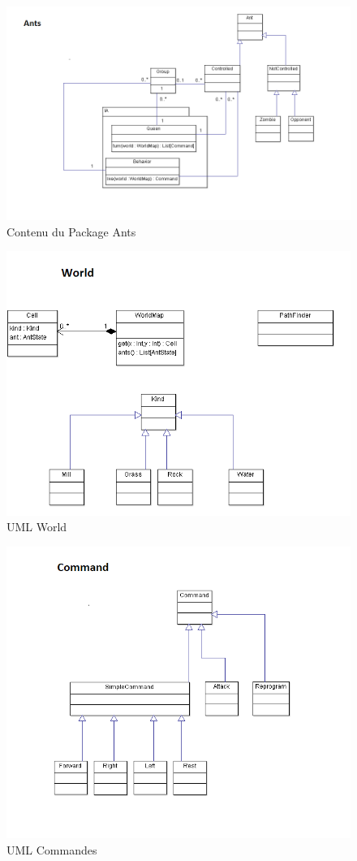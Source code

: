 \documentclass[11pt,a4paper]{article}
\begin{document}
\begin{figure}
  \includegraphics[width=\textwidth]{ants.png}
  \caption{Contenu du Package Ants}
\end{figure}

\begin{figure}
  \includegraphics[width=\textwidth]{world.png}
  \caption{UML World}
\end{figure}

\begin{figure}
  \includegraphics[width=\textwidth]{commands.png}
  \caption{UML Commandes}
\end{figure}
\end{document}
